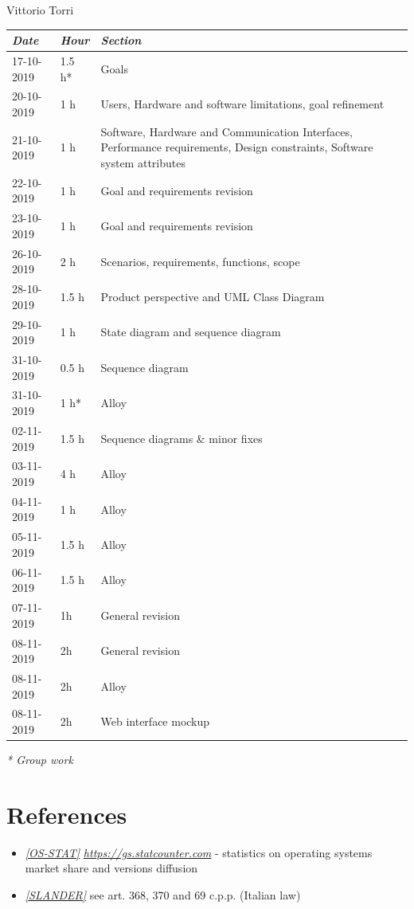 \documentclass[a4paper]{report}
\begin{document}
\begin{center}
Vittorio Torri \\
\begin{tabular}{p{2cm}p{1.5cm}p{7cm}}
\toprule
\textit{Date} & \textit{Hour} & \textit{Section} \\ \midrule
17-10-2019 & 1.5 h* & Goals \\ \midrule
20-10-2019 & 1 h & Users, Hardware and software limitations, goal refinement \\ \midrule
21-10-2019 & 1 h & Software, Hardware and Communication Interfaces, Performance requirements, Design constraints, Software system attributes \\ \midrule
22-10-2019 & 1 h & Goal and requirements revision \\ \midrule
23-10-2019 & 1 h & Goal and requirements revision \\ \midrule
26-10-2019 & 2 h & Scenarios, requirements, functions, scope \\  \midrule
28-10-2019 & 1.5 h & Product perspective and UML Class Diagram \\ \midrule
29-10-2019 & 1 h & State diagram and sequence diagram \\ \midrule
31-10-2019 & 0.5 h & Sequence diagram \\ \midrule
31-10-2019 & 1 h* & Alloy \\ \midrule
02-11-2019 & 1.5 h & Sequence diagrams \& minor fixes \\ \midrule
03-11-2019 & 4 h & Alloy \\ \midrule
04-11-2019 & 1 h & Alloy \\ \midrule 
05-11-2019 & 1.5 h & Alloy \\ \midrule
06-11-2019 & 1.5 h & Alloy \\ \midrule
07-11-2019 & 1h & General revision \\ \midrule
08-11-2019 & 2h & General revision \\ \midrule
08-11-2019 & 2h & Alloy \\ \midrule
08-11-2019 & 2h & Web interface mockup \\
\bottomrule
\end{tabular}
\end{center}
\textit{* Group work}

\chapter{References}
\begin{itemize}

\item \label{ref:os-stats} \hyperref[use:os-stats]{\textit{[OS-STAT]}} \href{https://gs.statcounter.com}{\textit{https://gs.statcounter.com}} - statistics on operating systems market share and versions diffusion

\item \label{ref:slander} \hyperref[use:slander]{\textit{[SLANDER]}} see art. 368, 370 and 69 c.p.p. (Italian law)

\end{itemize}
\end{document}

